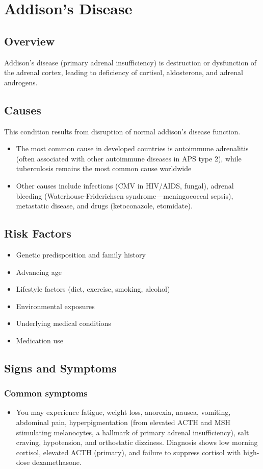 \chapter{Addison's Disease}
\label{sec:Addison's Disease}

\section{Overview}
Addison's disease (primary adrenal insufficiency) is destruction or dysfunction of the adrenal cortex, leading to deficiency of cortisol, aldosterone, and adrenal androgens.
\section{Causes}
This condition results from disruption of normal addison's disease function.

\begin{itemize}[noitemsep]
  \item The most common cause in developed countries is autoimmune adrenalitis (often associated with other autoimmune diseases in APS type 2), while tuberculosis remains the most common cause worldwide
  \item Other causes include infections (CMV in HIV/AIDS, fungal), adrenal bleeding (Waterhouse-Friderichsen syndrome---meningococcal sepsis), metastatic disease, and drugs (ketoconazole, etomidate).
\end{itemize}
\section{Risk Factors}


\begin{itemize}[noitemsep]
  \item Genetic predisposition and family history
  \item Advancing age
  \item Lifestyle factors (diet, exercise, smoking, alcohol)
  \item Environmental exposures
  \item Underlying medical conditions
  \item Medication use
\end{itemize}
\section{Signs and Symptoms}

\subsection{Common symptoms}
\begin{itemize}[noitemsep]
  \item You may experience fatigue, weight loss, anorexia, nausea, vomiting, abdominal pain, hyperpigmentation (from elevated ACTH and MSH stimulating melanocytes, a hallmark of primary adrenal insufficiency), salt craving, hypotension, and orthostatic dizziness. Diagnosis shows low morning cortisol, elevated ACTH (primary), and failure to suppress cortisol with high-dose dexamethasone. 
  \end{itemize}

